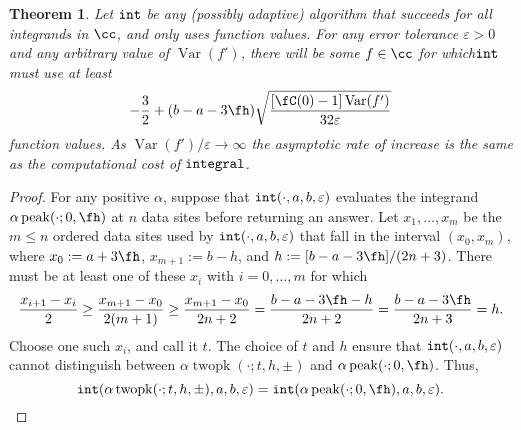 \documentclass[]{article}
\DeclareMathOperator{\integ}{\texttt{\textup{integral}}}
\DeclareMathOperator{\goodinteg}{\texttt{\textup{int}}}
\DeclareMathOperator{\Var}{Var}
\newtheorem{theorem}{Theorem}
\theoremstyle{definition}
\theoremstyle{remark}
\DeclareMathOperator{\tri}{peak}
\DeclareMathOperator{\twopk}{twopk}
\newcommand{\hcut}{\fh}
\begin{document}
\begin{theorem}
Let $\goodinteg$ be any (possibly adaptive) algorithm that succeeds for all integrands in $\cc$, and only uses function values.  For any error tolerance $\varepsilon>0$ and any arbitrary value of $\Var(f')$, there will be some $f \in \cc$ for which$\goodinteg$ must use at least 
\begin{equation} \label{lowbdcone}
-\frac{3}{2}+(b-a-3\hcut)\sqrt{\frac{[\fC(0)-1]\Var(f')}{32\varepsilon}}
\end{equation}
function values.  As $\Var(f')/\varepsilon \to \infty$ the asymptotic rate of increase is the same as the computational cost of $\integ$.
\end{theorem}
\begin{proof}
For any positive $\alpha$, suppose that  $\goodinteg(\cdot,a,b,\varepsilon)$ evaluates the integrand $\alpha \tri(\cdot;0,\hcut)$ at $n$ data sites before returning an answer.  Let $x_1, \ldots, x_m$ be the $m \le n$ ordered data sites used by $\goodinteg(\cdot,a,b,\varepsilon)$ that fall in the interval $(x_0, x_m)$, where $x_0:=a+3\hcut$, $x_{m+1}:=b-h$, and $h:=[b-a-3\hcut]/(2n+3)$.  There must be at least one of these $x_i$ with $i=0, \ldots, m$ for which 
\[
\frac{x_{i+1}-x_i}{2} \ge \frac{x_{m+1}-x_0}{2(m+1)} \ge \frac{x_{m+1}-x_0}{2n+2}
= \frac{b-a-3 \hcut-h}{2n+2}=\frac{b-a-3 \hcut}{2n+3} = h.
\]
Choose one such $x_i$, and call it $t$.  The choice of $t$ and $h$ ensure that $\goodinteg(\cdot,a,b,\varepsilon)$ cannot distinguish between $\alpha\twopk(\cdot;t,h,\pm)$ and $\alpha \tri(\cdot;0,\hcut)$.  Thus, 
\[
\goodinteg(\alpha\twopk(\cdot;t,h,\pm),a,b,\varepsilon) = \goodinteg(\alpha \tri(\cdot;0,\hcut),a,b,\varepsilon). 
\]


\end{proof}
\end{document}
